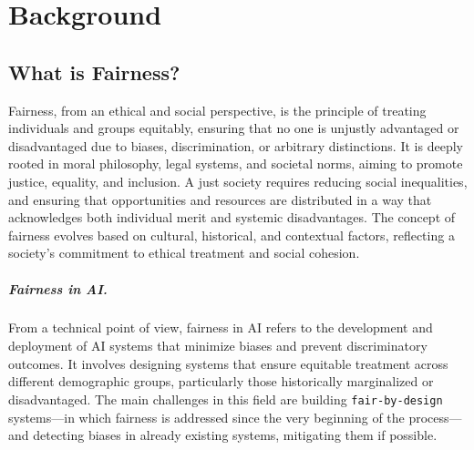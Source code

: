 \documentclass[12pt,a4paper,openright,twoside]{book}
\begin{document}
\chapter{Background}%
\label{chap:background}

\section{What is Fairness?}
%
%
Fairness, from an ethical and social perspective, is the principle of treating individuals and groups equitably, ensuring that no one is unjustly advantaged or disadvantaged due to biases, discrimination, or arbitrary distinctions.
%
It is deeply rooted in moral philosophy, legal systems, and societal norms, aiming to promote justice, equality, and inclusion.
%
A just society requires reducing social inequalities, and ensuring that opportunities and resources are distributed in a way that acknowledges both individual merit and systemic disadvantages.
%
The concept of fairness evolves based on cultural, historical, and contextual factors, reflecting a society’s commitment to ethical treatment and social cohesion.


\paragraph{Fairness in \acs{AI}.}

From a technical point of view, fairness in \ac{AI} refers to the development and deployment of \ac{AI} systems that minimize biases and prevent discriminatory outcomes.
%
It involves designing systems that ensure equitable treatment across different demographic groups, particularly those historically marginalized or disadvantaged.
%
%
The main challenges in this field are building \texttt{fair-by-design} systems---in which fairness is addressed since the very beginning of the process---and detecting biases in already existing systems, mitigating them if possible.
%
\end{document}
